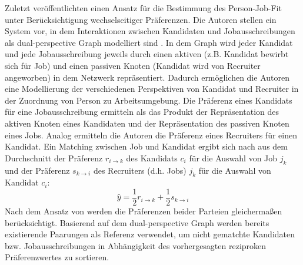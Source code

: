 Zuletzt veröffentlichten \textcite[S. 102ff.]{yang:inproceedings} einen Ansatz für die Bestimmung des Person-Job-Fit unter Berücksichtigung wechselseitiger Präferenzen.
Die Autoren stellen ein System vor, in dem Interaktionen zwischen Kandidaten und Jobausschreibungen als dual-perspective Graph modelliert sind \cite[S. 102]{yang:inproceedings}.
In dem Graph wird jeder Kandidat und jede Jobausschreibung jeweils durch einen aktiven (z.B. Kandidat bewirbt sich für Job) und einen passiven Knoten (Kandidat wird von Recruiter angeworben) in dem Netzwerk repräsentiert.
Dadurch ermöglichen die Autoren eine Modellierung der verschiedenen Perspektiven von Kandidat und Recruiter in der Zuordnung von Person zu Arbeitsumgebung.
Die Präferenz eines Kandidats für eine Jobausschreibung ermitteln \textcite[S. 106]{yang:inproceedings} als das Produkt der Repräsentation des aktiven Knoten eines Kandidaten und der Repräsentation des passiven Knoten eines Jobs.
Analog ermitteln die Autoren die Präferenz eines Recruiters für einen Kandidat.
Ein Matching zwischen Job und Kandidat ergibt sich nach \textcite[S. 106]{yang:inproceedings} aus dem Durchschnitt der Präferenz $r_{i\rightarrow k}$ des Kandidats $c_{i}$ für die Auswahl von Job $j_{k}$ und der Präferenz $s_{k\rightarrow i}$ des Recruiters (d.h. Jobs) $j_{k}$ für die Auswahl von Kandidat $c_{i}$:
\begin{equation}\label{eq38}
    \hat{y} = \frac{1}{2} r_{i\rightarrow k} +\frac{1}{2} s_{k\rightarrow i}
\end{equation}
Nach dem Ansatz von \textcite[S. 102ff.]{yang:inproceedings} werden die Präferenzen beider Parteien gleichermaßen berücksichtigt.
Basierend auf dem dual-perspective Graph werden bereits existierende Paarungen als Referenz verwendet, um nicht gematchte Kandidaten bzw. Jobausschreibungen in Abhängigkeit des vorhergesagten reziproken Präferenzwertes zu sortieren.

